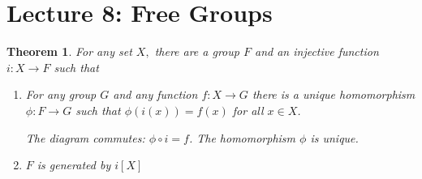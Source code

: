 \documentclass[a4paper,12pt]{article}
\newtheorem{thm}{Theorem}[section]
\begin{document}
\section{Lecture 8: Free Groups}
\begin{thm}
    For any set $X,$ there are a group $F$ and an injective function $i:X\to F$ such that \begin{enumerate}
        \item For any group $G$ and any function $f:X\to G$ there is a unique homomorphism $\phi:F\to G$ such that $\phi(i(x))=f(x)$ for all $x\in X$.
        \begin{center}
        \end{center}
        The diagram commutes: $\phi \circ i = f$. The homomorphism $\phi$ is unique.
        \item $F$ is generated by $i[X]$
    \end{enumerate}
\end{thm}
\end{document}

